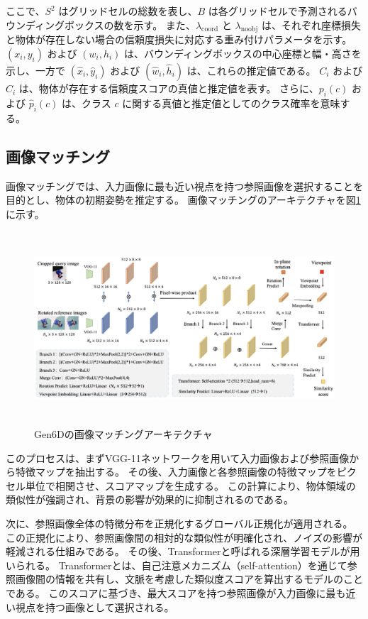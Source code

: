 ここで、$S^2$ はグリッドセルの総数を表し、$B$ は各グリッドセルで予測されるバウンディングボックスの数を示す。
また、$\lambda_{\text{coord}}$ と $\lambda_{\text{noobj}}$ は、それぞれ座標損失と物体が存在しない場合の信頼度損失に対応する重み付けパラメータを示す。
$(x_i, y_i)$ および $(w_i, h_i)$ は、バウンディングボックスの中心座標と幅・高さを示し、一方で $(\hat{x}_i, \hat{y}_i)$ および $(\hat{w}_i, \hat{h}_i)$ は、これらの推定値である。
$C_i$ および $\hat{C}_i$ は、物体が存在する信頼度スコアの真値と推定値を表す。
さらに、$p_i(c)$ および $\hat{p}_i(c)$ は、クラス $c$ に関する真値と推定値としてのクラス確率を意味する。


\subsection{画像マッチング}
画像マッチングでは、入力画像に最も近い視点を持つ参照画像を選択することを目的とし、物体の初期姿勢を推定する。
画像マッチングのアーキテクチャを図\ref{fig:f5}に示す。
\begin{figure}[htbt]
	\centering
	 \includegraphics[height=72mm]{Figure/selector_arc.eps}
	 \caption{Gen6Dの画像マッチングアーキテクチャ}
	 \label{fig:f5}
\end{figure}

このプロセスは、まずVGG-11ネットワークを用いて入力画像および参照画像から特徴マップを抽出する。
その後、入力画像と各参照画像の特徴マップをピクセル単位で相関させ、スコアマップを生成する。
この計算により、物体領域の類似性が強調され、背景の影響が効果的に抑制されるのである。

次に、参照画像全体の特徴分布を正規化するグローバル正規化が適用される。
この正規化により、参照画像間の相対的な類似性が明確化され、ノイズの影響が軽減される仕組みである。
その後、Transformerと呼ばれる深層学習モデルが用いられる。
Transformerとは、自己注意メカニズム（self-attention）を通じて参照画像間の情報を共有し、文脈を考慮した類似度スコアを算出するモデルのことである。
このスコアに基づき、最大スコアを持つ参照画像が入力画像に最も近い視点を持つ画像として選択される。


